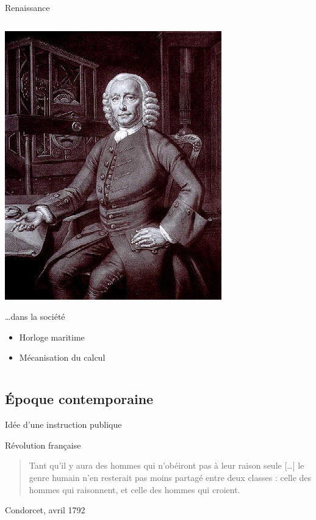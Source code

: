 \begin{frame}{Renaissance}
\begin{columns}
\begin{column}{0.49\linewidth}
	\begin{centering}
	\includegraphics[height=0.4\paperheight]{../resources/illustrations/harrison} \\
	\end{centering}
\ldots dans la société
\begin{itemize}
\item Horloge maritime
\item Mécanisation du calcul
\end{itemize}
\end{column}
\end{columns}
\end{frame}

\subsection{Époque contemporaine}

\begin{frame}{Idée d'une instruction publique}

Révolution française

\begin{quote}
Tant qu'il y aura des hommes qui n'obéiront pas à leur raison seule [\ldots] le genre humain n'en resterait pas moins partagé entre deux classes : celle des hommes qui raisonnent, et celle 
des hommes qui croient.
\end{quote}
Condorcet, avril 1792

\end{frame}

